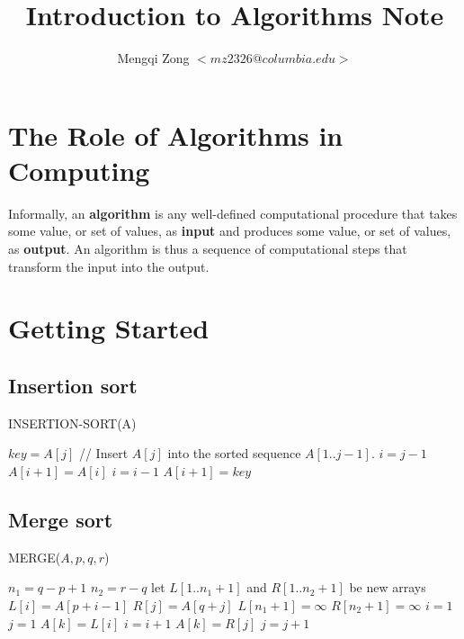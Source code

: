 \documentclass[12pt]{article}
\title{Introduction to Algorithms Note}
\author{Mengqi Zong $<mz2326@columbia.edu>$}
\begin{document}
\maketitle

\tableofcontents

\setlength{\parindent}{0in}

\section{The Role of Algorithms in Computing}

Informally, an \textbf {algorithm} is any well-defined computational procedure that takes some value, or set of values, as \textbf {input} and produces some value, or set of values, as \textbf {output}. An algorithm is thus a sequence of computational steps that transform the input into the output.

\section{Getting Started}

\subsection{Insertion sort}

INSERTION-SORT(A)
\begin{algorithmic}[1]
	\State $key = A[j]$
        \State // Insert $A[j]$ into the sorted sequence $A[1..j-1]$.
        \State $i = j - 1$
        	\State $A[i+1] = A[i]$
                \State $i = i - 1$
        \EndWhile
        \State $A[i+1] = key$
\EndFor
\end{algorithmic}

\subsection{Merge sort}

MERGE($A, p, q, r$)
\begin{algorithmic}[1]
\State $n_1 = q - p + 1$
\State $n_2 = r - q$
\State let $L[1..n_1+1]$ and $R[1..n_2+1]$ be new arrays
	\State $L[i] = A[p+i-1]$
\EndFor
{}
	\State $R[j] = A[q+j]$
\EndFor
\State $L[n_1 + 1] = \infty$
\State $R[n_2 + 1] = \infty$
\State $i = 1$
\State $j = 1$
        	\State $A[k] = L[i]$
                \State $i = i + 1$
        \Else
        	\State $A[k] = R[j]$
        	\State $j = j + 1$
        \EndIf
\EndFor
\end{algorithmic}
\end{document}
